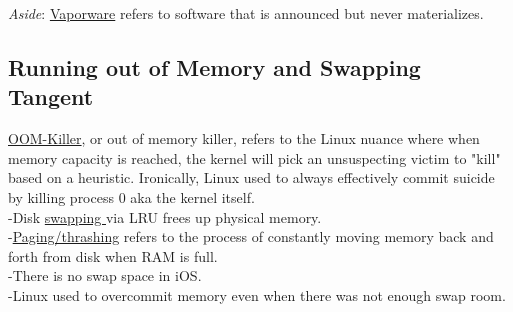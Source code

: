 \documentclass[twoside]{article}
\begin{document}
\emph{Aside}:  \underline{Vaporware} refers to software that is announced but never materializes.
\subsection{Running out of Memory and Swapping Tangent}

\underline{OOM-Killer}, or out of memory killer, refers to the Linux nuance where when memory capacity is reached, the kernel will pick an unsuspecting victim to "kill" based on a heuristic. Ironically, Linux used to always effectively commit suicide by killing process 0 aka the kernel itself.\\
-Disk \underline{swapping }via LRU frees up physical memory. \\
-\underline{Paging/thrashing} refers to the process of constantly moving memory back and forth from disk when RAM is full. \\
-There is no  swap space in iOS.\\
-Linux used to overcommit memory even when there was not enough swap room.
\end{document}
